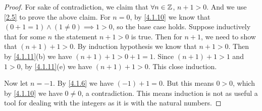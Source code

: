 \begin{proof}
  For sake of contradiction, we claim that \(\forall n \in \mathbb{Z}\), \(n + 1 > 0\).
  And we use \cref{2.5} to prove the above claim.
  For \(n = 0\), by \cref{4.1.10} we know that \((0 + 1 = 1) \land (1 \neq 0) \implies 1 > 0\), so the base case holds.
  Suppose inductively that for some \(n\) the statement \(n + 1 > 0\) is true.
  Then for \(n + 1\), we need to show that \((n + 1) + 1 > 0\).
  By induction hypothesis we know that \(n + 1 > 0\).
  Then by \cref{4.1.11}(b) we have \((n + 1) + 1 > 0 + 1 = 1\).
  Since \((n + 1) + 1 > 1\) and \(1 > 0\), by \cref{4.1.11}(e) we have \((n + 1) + 1 > 0\).
  This close induction.

  Now let \(n = -1\).
  By \cref{4.1.6} we have \((-1) + 1 = 0\).
  But this means \(0 > 0\), which by \cref{4.1.10} we have \(0 \neq 0\), a contradiction.
  This means induction is not as useful a tool for dealing with the integers as it is with the natural numbers.
\end{proof}
